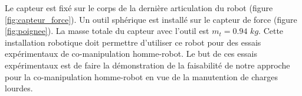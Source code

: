 \documentclass[12pt,a4paper,twoside]{report}
\begin{document}
Le capteur est fixé sur le corps de la dernière articulation du robot (figure \ref{fig:capteur_force}). Un outil sphérique est installé sur le capteur de force (figure \ref{fig:poignee}). La masse totale du capteur avec l'outil est $m_t = 0.94$ $kg$. Cette installation robotique doit permettre d'utiliser ce robot pour des essais expérimentaux de co-manipulation homme-robot.  Le but de ces essais expérimentaux est de faire la démonstration de la faisabilité de notre approche pour la co-manipulation homme-robot en vue de la manutention de charges lourdes.
\end{document}
